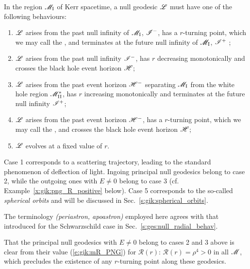 \begin{greybox}
In the region $\mathscr{M}_{\rm I}$ of Kerr spacetime,
a null geodesic $\mathscr{L}$ must have one of the following behaviours:
\begin{enumerate}
\item $\mathscr{L}$ arises from the past null infinity of $\mathscr{M}_{\rm I}$, $\mathscr{I}^-$, has a $r$-turning point,
which we may call the , and terminates at the future null infinity
of $\mathscr{M}_{\rm I}$, $\mathscr{I}^+$ ;
\item $\mathscr{L}$ arises from the past null infinity $\mathscr{I}^-$, has $r$ decreasing
monotonically and crosses the black hole event horizon $\mathscr{H}$;
\item $\mathscr{L}$ arises from the past event horizon $\mathscr{H}^-$ separating $\mathscr{M}_{\rm I}$
from the white hole region $\mathscr{M}_{\rm II}^*$, has $r$ increasing monotonically and
terminates at the future null infinity $\mathscr{I}^+$;
\item $\mathscr{L}$ arises from the past event horizon $\mathscr{H}^-$, has a $r$-turning point,
which we may call the , and crosses the black hole event horizon $\mathscr{H}$;
\item $\mathscr{L}$ evolves at a fixed value of $r$.
\end{enumerate}
\end{greybox}
Case 1 corresponds to a scattering trajectory, leading to the standard phenomenon of deflection of light.
Ingoing principal null geodesics belong to case 2, while the outgoing ones with $E\neq 0$ belong to case 3
(cf. Example~\ref{x:gik:png_R_positive} below).
Case 5 corresponds to the so-called \emph{spherical orbits} and will be discussed in Sec.~\ref{s:gik:spherical_orbits}.

\begin{remark}
The terminology  \emph{(periastron, apoastron)} employed here agrees with that
introduced for the Schwarzschild case in Sec.~\ref{s:ges:null_radial_behav}.
\end{remark}

\begin{example} \label{x:gik:png_R_positive}
That the principal null geodesics with $E\neq 0$ belong to cases 2 and 3 above
is clear from their value (\ref{e:gik:mR_PNG}) for $\mathcal{R}(r)$:
$\mathcal{R}(r) = \rho^4 > 0$ in all $\mathscr{M}$, which precludes the existence
of any $r$-turning point along these geodesics.
\end{example}


